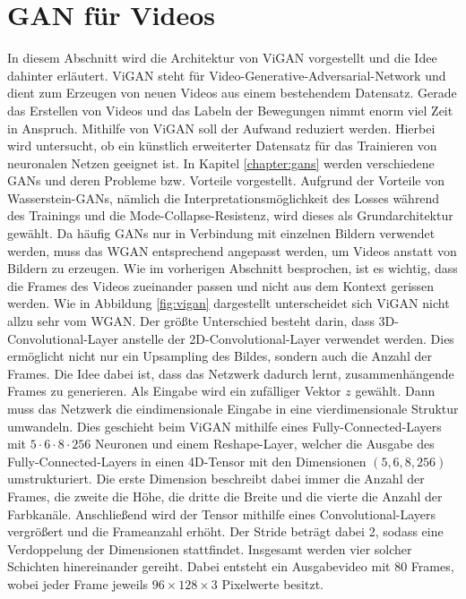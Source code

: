 \section{GAN für Videos}
In diesem Abschnitt wird die Architektur von ViGAN vorgestellt und die
Idee dahinter erläutert. ViGAN steht für Video-Generative-Adversarial-Network
und dient zum Erzeugen von neuen Videos aus einem bestehendem Datensatz. Gerade
das Erstellen von Videos und das Labeln der Bewegungen nimmt enorm viel Zeit in
Anspruch. Mithilfe von ViGAN soll der Aufwand reduziert werden. Hierbei wird
untersucht, ob ein künstlich erweiterter Datensatz für das Trainieren von
neuronalen Netzen geeignet ist. In Kapitel \ref{chapter:gans} werden
verschiedene GANs und deren Probleme bzw. Vorteile vorgestellt. Aufgrund der
Vorteile von Wasserstein-GANs, nämlich die Interpretationsmöglichkeit des Losses
während des Trainings und die Mode-Collapse-Resistenz, wird dieses als
Grundarchitektur gewählt. Da häufig GANs nur in Verbindung mit einzelnen Bildern
verwendet werden, muss das WGAN entsprechend angepasst werden, um Videos anstatt
von Bildern zu erzeugen. Wie im vorherigen Abschnitt besprochen, ist es wichtig,
dass die Frames des Videos zueinander passen und nicht aus dem Kontext gerissen
werden. Wie in Abbildung \ref{fig:vigan} dargestellt unterscheidet sich ViGAN
nicht allzu sehr vom WGAN. Der größte Unterschied besteht darin, dass
3D-Convolutional-Layer anstelle der 2D-Convolutional-Layer verwendet werden.
Dies ermöglicht nicht nur ein Upsampling des Bildes, sondern auch die Anzahl der
Frames. Die Idee dabei ist, dass das Netzwerk dadurch lernt, zusammenhängende
Frames zu generieren. Als Eingabe wird ein zufälliger Vektor $z$ gewählt. Dann
muss das Netzwerk die eindimensionale Eingabe in eine vierdimensionale Struktur
umwandeln. Dies geschieht beim ViGAN mithilfe eines Fully-Connected-Layers mit
$5 \cdot 6 \cdot 8 \cdot 256$ Neuronen und einem Reshape-Layer, welcher die
Ausgabe des Fully-Connected-Layers in einen 4D-Tensor mit den Dimensionen $(5,
6, 8, 256)$ umstrukturiert. Die erste Dimension beschreibt dabei immer die
Anzahl der Frames, die zweite die Höhe, die dritte die Breite und die vierte die
Anzahl der Farbkanäle. Anschließend wird der Tensor mithilfe eines
Convolutional-Layers vergrößert und die Frameanzahl erhöht. Der Stride beträgt
dabei 2, sodass eine Verdoppelung der Dimensionen stattfindet. Insgesamt werden
vier solcher Schichten hinereinander gereiht. Dabei entsteht ein Ausgabevideo
mit 80 Frames, wobei jeder Frame jeweils $96 \times 128 \times 3$ Pixelwerte
besitzt.

